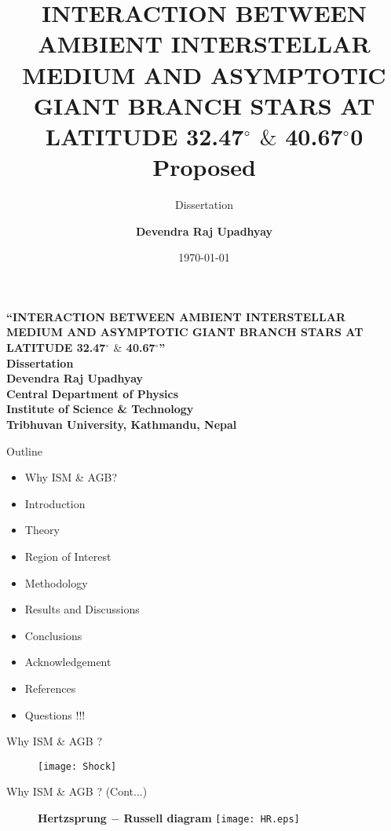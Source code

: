 \documentclass[12pt,a4paper]{beamer}
\author{\bf{Devendra Raj Upadhyay}}
\institute{CDP, TU}
\title[ISM \& AGB Star]{\Large\bf{INTERACTION BETWEEN AMBIENT INTERSTELLAR MEDIUM AND ASYMPTOTIC GIANT BRANCH STARS AT LATITUDE
32.47$^{\circ}$ $\&$ 40.67$^{\circ}$0 Proposed}}
\subtitle{Dissertation}
\date{\today}
\begin{document}
\begin{frame}
\begin{center}
\Large\bf{\color{blue}``INTERACTION BETWEEN AMBIENT INTERSTELLAR MEDIUM AND ASYMPTOTIC GIANT BRANCH STARS AT LATITUDE
32.47$^{\circ}$ $\&$ 40.67$^{\circ}$''}\\[1cm]
Dissertation\\[1cm]
\bf{Devendra Raj Upadhyay}
{\color{blue}\\Central Department of Physics\\Institute of Science \& Technology\\Tribhuvan University, Kathmandu, Nepal}\\
\end{center}
\end{frame}
\begin{frame}{Outline}
\begin{itemize}
\item<1-> {Why ISM \& AGB?}
\item<1-> Introduction
\item<1-> Theory
\item<1-> Region of Interest
\item<1-> Methodology
\item<1-> Results and Discussions
\item<1-> Conclusions
\item<1-> Acknowledgement
\item<1-> References
\item<1-> Questions !!!
\end{itemize}
\end{frame}

\begin{frame}
\begin{center}
\Large\bf\color{red}{Why ISM \& AGB?}
\end{center}
\end{frame}


\begin{frame}{Why ISM \& AGB ?}
\begin{figure}[h]
\vspace{0.0cm} \centering
  \texttt{[image: Shock]}\cite{10}
\end{figure}
\end{frame}

\begin{frame}{Why ISM \& AGB ? (Cont...)}
 \begin{figure}[h]
 \begin{block}{\centering\textbf{Hertzsprung $-$ Russell diagram \vspace*{.25cm}}}
\vspace{0.0cm} \centering
\texttt{[image: HR.eps]}\cite{26}
\end{block}
\end{figure}
\end{frame}
\end{document}
